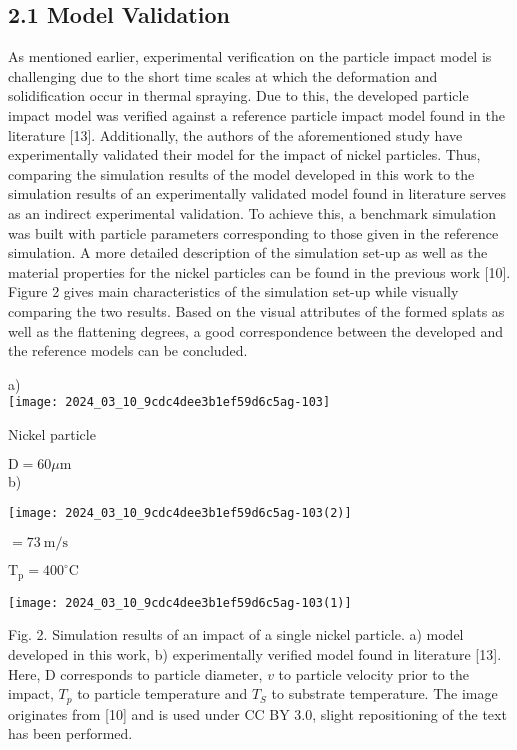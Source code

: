 \documentclass[10pt]{article}
\begin{document}
\subsection*{2.1 Model Validation}
As mentioned earlier, experimental verification on the particle impact model is challenging due to the short time scales at which the deformation and solidification occur in thermal spraying. Due to this, the developed particle impact model was verified against a reference particle impact model found in the literature [13]. Additionally, the authors of the aforementioned study have experimentally validated their model for the impact of nickel particles. Thus, comparing the simulation results of the model developed in this work to the simulation results of an experimentally validated model found in literature serves as an indirect experimental validation. To achieve this, a benchmark simulation was built with particle parameters corresponding to those given in the reference simulation. A more detailed description of the simulation set-up as well as the material properties for the nickel particles can be found in the previous work [10]. Figure 2 gives main characteristics of the simulation set-up while visually comparing the two results. Based on the visual attributes of the formed splats as well as the flattening degrees, a good correspondence between the developed and the reference models can be concluded.

a)\\
\texttt{[image: 2024\_03\_10\_9cdc4dee3b1ef59d6c5ag-103]}

Nickel particle

$\mathrm{D}=60 \mu \mathrm{m}$\\
b)

\begin{center}
\texttt{[image: 2024\_03\_10\_9cdc4dee3b1ef59d6c5ag-103(2)]}
\end{center}

$=73 \mathrm{~m} / \mathrm{s}$

$\mathrm{T}_{\mathrm{p}}=400^{\circ} \mathrm{C}$

\begin{center}
\texttt{[image: 2024\_03\_10\_9cdc4dee3b1ef59d6c5ag-103(1)]}
\end{center}

Fig. 2. Simulation results of an impact of a single nickel particle. a) model developed in this work, b) experimentally verified model found in literature [13]. Here, D corresponds to particle diameter, $v$ to particle velocity prior to the impact, $T_{p}$ to particle temperature and $T_{S}$ to substrate temperature. The image originates from [10] and is used under CC BY 3.0, slight repositioning of the text has been performed.
\end{document}
